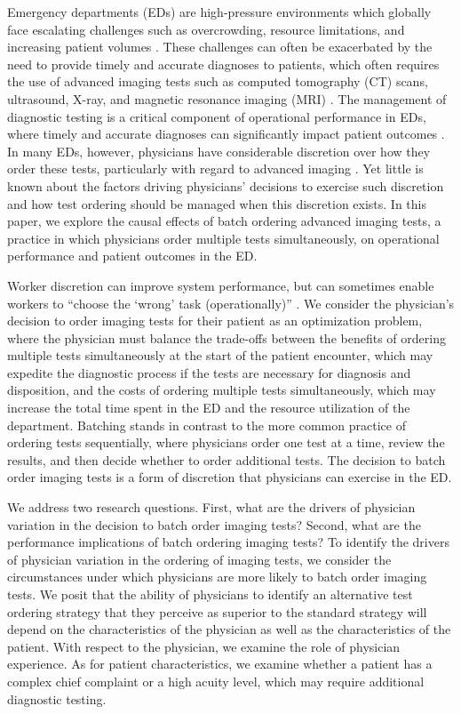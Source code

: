 \documentclass[,mnsc,nonblindrev]{informs}
\begin{document}
Emergency departments (EDs) are high-pressure environments which
globally face escalating challenges such as overcrowding, resource
limitations, and increasing patient volumes
\citep[\citet{Sorup2013evaluation}]{mostafa2024strategies}. These
challenges can often be exacerbated by the need to provide timely and
accurate diagnoses to patients, which often requires the use of advanced
imaging tests such as computed tomography (CT) scans, ultrasound, X-ray,
and magnetic resonance imaging (MRI) \citep{waheed2022impact}. The
management of diagnostic testing is a critical component of operational
performance in EDs, where timely and accurate diagnoses can
significantly impact patient outcomes \citep{committee2015improving}. In
many EDs, however, physicians have considerable discretion over how they
order these tests, particularly with regard to advanced imaging
\citep{valtchinov2019use}. Yet little is known about the factors driving
physicians' decisions to exercise such discretion and how test ordering
should be managed when this discretion exists. In this paper, we explore
the causal effects of batch ordering advanced imaging tests, a practice
in which physicians order multiple tests simultaneously, on operational
performance and patient outcomes in the ED.

Worker discretion can improve system performance, but can sometimes
enable workers to ``choose the `wrong' task (operationally)''
\citep{vanDonselaar2010ordering}. We consider the physician's decision
to order imaging tests for their patient as an optimization problem,
where the physician must balance the trade-offs between the benefits of
ordering multiple tests simultaneously at the start of the patient
encounter, which may expedite the diagnostic process if the tests are
necessary for diagnosis and disposition, and the costs of ordering
multiple tests simultaneously, which may increase the total time spent
in the ED and the resource utilization of the department. Batching
stands in contrast to the more common practice of ordering tests
sequentially, where physicians order one test at a time, review the
results, and then decide whether to order additional tests. The decision
to batch order imaging tests is a form of discretion that physicians can
exercise in the ED.

We address two research questions. First, what are the drivers of
physician variation in the decision to batch order imaging tests?
Second, what are the performance implications of batch ordering imaging
tests? To identify the drivers of physician variation in the ordering of
imaging tests, we consider the circumstances under which physicians are
more likely to batch order imaging tests. We posit that the ability of
physicians to identify an alternative test ordering strategy that they
perceive as superior to the standard strategy will depend on the
characteristics of the physician as well as the characteristics of the
patient. With respect to the physician, we examine the role of physician
experience. As for patient characteristics, we examine whether a patient
has a complex chief complaint or a high acuity level, which may require
additional diagnostic testing.
\end{document}
